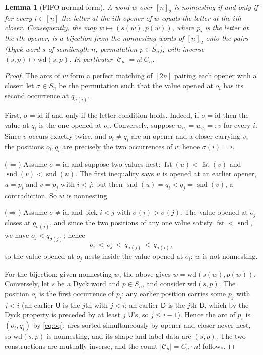 \documentclass[11pt]{article}
\newtheorem{lemma}[theorem]{Lemma}
\theoremstyle{definition}
\theoremstyle{remark}
\newcommand{\nn}{[n]_2}
\DeclareMathOperator{\fst}{fst}
\DeclareMathOperator{\snd}{snd}
\newcommand{\sU}{\mathsf{U}}
\newcommand{\sD}{\mathsf{D}}
\newcommand{\Cat}{C}
\begin{document}
\begin{lemma}[FIFO normal form]\label{lem:fifo}
A word $w$ over $\nn$ is nonnesting if and only if for every $i\in[n]$ the
letter at the $i$th opener of $w$ equals the letter at the $i$th closer.
Consequently, the map $w\mapsto (s(w),p(w))$, where $p_i$ is the letter at
the $i$th opener, is a bijection from the nonnesting words of $\nn$ onto the
pairs (Dyck word $s$ of semilength $n$, permutation $p\in S_n$), with
inverse $(s,p)\mapsto\mathrm{wd}(s,p)$. In particular
$|\mathcal C_n| = n!\,\Cat_n$.
\end{lemma}

\begin{proof}
The arcs of $w$ form a perfect matching of $[2n]$ pairing each opener with a
closer; let $\sigma\in S_n$ be the permutation such that the value opened at
$o_i$ has its second occurrence at $q_{\sigma(i)}$.

First, $\sigma=\mathrm{id}$ if and only if the letter condition holds.
Indeed, if $\sigma=\mathrm{id}$ then the value at $q_i$ is the one opened at
$o_i$. Conversely, suppose $w_{o_i}=w_{q_i}=:v$ for every $i$. Since $v$
occurs exactly twice, and $o_i\neq q_i$ are an opener and a closer carrying
$v$, the positions $o_i,q_i$ are precisely the two occurrences of $v$; hence
$\sigma(i)=i$.

($\Leftarrow$) Assume $\sigma=\mathrm{id}$ and suppose two values nest:
$\fst(u)<\fst(v)$ and $\snd(v)<\snd(u)$. The first inequality says $u$ is
opened at an earlier opener, $u=p_i$ and $v=p_j$ with $i<j$; but then
$\snd(u)=q_i<q_j=\snd(v)$, a contradiction. So $w$ is nonnesting.

($\Rightarrow$) Assume $\sigma\neq\mathrm{id}$ and pick $i<j$ with
$\sigma(i)>\sigma(j)$. The value opened at $o_j$ closes at $q_{\sigma(j)}$,
and since the two positions of any one value satisfy $\fst<\snd$, we have
$o_j<q_{\sigma(j)}$; hence
\[
  o_i \,<\, o_j \,<\, q_{\sigma(j)} \,<\, q_{\sigma(i)},
\]
so the value opened at $o_j$ nests inside the value opened at $o_i$: $w$ is
not nonnesting.

For the bijection: given nonnesting $w$, the above gives
$w=\mathrm{wd}(s(w),p(w))$. Conversely, let $s$ be a Dyck word and
$p\in S_n$, and consider $\mathrm{wd}(s,p)$. The position $o_i$ is the first
occurrence of $p_i$: any earlier position carries some $p_j$ with $j<i$ (an
earlier $\sU$ is the $j$th with $j<i$; an earlier $\sD$ is the $j$th $\sD$,
which by the Dyck property is preceded by at least $j$ $\sU$'s, so $j\le
i-1$). Hence the arc of $p_i$ is $(o_i,q_i)$ by \eqref{eq:oq}; arcs sorted
simultaneously by opener and closer never nest, so $\mathrm{wd}(s,p)$ is
nonnesting, and its shape and label data are $(s,p)$. The two constructions
are mutually inverse, and the count $|\mathcal C_n|=\Cat_n\cdot n!$ follows.
\end{proof}
\end{document}
